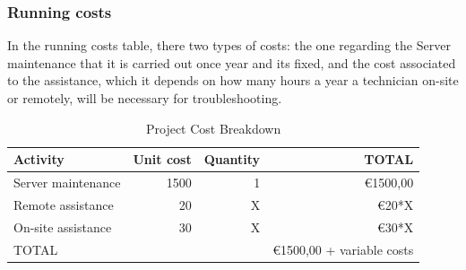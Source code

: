\newpage 

\subsubsection{Running costs}
In the running costs table, there two types of costs: the one regarding the Server maintenance that it is carried out once year and its fixed, and the cost associated to the assistance, which it depends on how many hours a year a technician on-site or remotely, will be necessary for troubleshooting.
\begin{table}[htbp]
    \centering
    \caption{Project Cost Breakdown} 
    \begin{tabular}{lrrr}
        \toprule
        Activity & Unit cost & Quantity & TOTAL \\
        \midrule
        Server maintenance & 1500 & 1 & €1500,00 \\
        Remote assistance & 20 & X & €20*X \\
        On-site assistance & 30 & X & €30*X \\
        \midrule
        TOTAL & & & €1500,00 + variable costs \\
        \bottomrule
    \end{tabular}
\end{table}